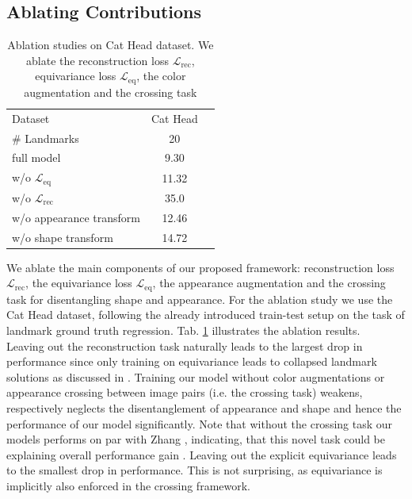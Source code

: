 	\subsection{Ablating Contributions}\label{sec:ablation}
	\begin{table}
		\centering
		\begin{tabular}{l|cr}
			\hline
			Dataset & Cat Head    \\
			\# Landmarks &  20 \\ \hline
			full model &  9.30 \\ \hline
			w/o $\mathcal{L}_{\textrm{eq}}$   & 11.32 \\
			w/o $\mathcal{L}_{\textrm{rec}}$   & 35.0 \\
			w/o appearance transform & 12.46 \\
			w/o shape transform & 14.72 \\ \hline
		\end{tabular}
		\caption{{Ablation studies on Cat Head dataset. We ablate the reconstruction loss $\mathcal{L}_{\textrm{rec}}$, equivariance loss $\mathcal{L}_{\textrm{eq}}$, the color augmentation and the crossing task}}
		\label{tab:ablation}
	\end{table}

	We ablate the main components of our proposed framework: reconstruction loss $\mathcal{L}_{\textrm{rec}}$, the equivariance loss $\mathcal{L}_{\textrm{eq}}$, the appearance augmentation and the crossing task for disentangling shape and appearance. For the ablation study we use the Cat Head dataset, following the already introduced train-test setup on the task of landmark ground truth regression. Tab. \ref{tab:ablation} illustrates the ablation results.\\
	Leaving out the reconstruction task naturally leads to the largest drop in performance since only training on equivariance leads to collapsed landmark solutions as discussed in \cite{zhang18}.
	Training our model without color augmentations or appearance crossing between image pairs (i.e. the crossing task) weakens, respectively neglects the disentanglement of appearance and shape and hence the performance of our model significantly. %
	Note that without the crossing task our models performs on par with Zhang \etal \cite{zhang18}, indicating, that this novel task could be explaining overall performance gain \wrt \cite{zhang18}. %
	Leaving out the explicit equivariance leads to the smallest drop in performance. This is not surprising, as equivariance is implicitly also enforced in the crossing framework.

